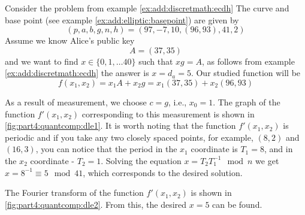 \begin{example}
Consider the problem from example \ref{ex:add:discretmath:ecdh}
The curve and base point (see example \ref{ex:add:elliptic:basepoint})
are given by
\[
(p,a,b,g,n,h) = (97, -7, 10, (96,93), 41, 2)
\]
Assume we know Alice's public key
\[
A = (37, 35)
\]
and we want to find $x \in \{0,1, \dots 40\}$ such that
$x g = A$, as follows from example \ref{ex:add:discretmath:ecdh}
the answer is $x = d_a  = 5$.
Our studied function will be
\[
f\left(x_1,x_2\right) = x_1 A + x_2 g = x_1 (37,35) + x_2 (96,93)
\]



As a result of measurement, we choose $c = g$, i.e., $x_0 = 1$.
The graph of the function $f'(x_1, x_2)$ corresponding to this measurement
is shown in \autoref{fig:part4:quantcomp:dle1}. It is worth noting that
the function $f'(x_1, x_2)$ is periodic and if you take any two
closely spaced points, for example, $(8,2)$ and $(16,3)$, you can notice that
the period in the $x_1$ coordinate is $T_1=8$, and in the $x_2$ coordinate - $T_2
= 1$. Solving the equation $x = T_2 T_1^{-1} \mod n$ we get $x = 8^{-1}
 \equiv 5 \mod 41$, which corresponds to the desired solution.



The Fourier transform of the function $f'(x_1, x_2)$ is shown in
\autoref{fig:part4:quantcomp:dle2}. From this, the desired $x =
5$ can be found. 

\end{example}